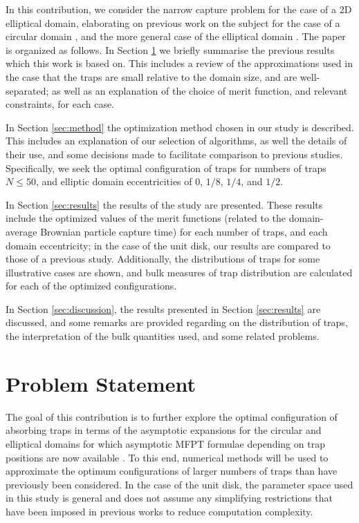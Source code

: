 \documentclass[11pt,letter,subeqn,fleqn]{article}
\begin{document}
In this contribution, we consider the narrow capture problem for the case of a 2D elliptical domain, elaborating on previous work on the subject for the case of a circular domain \cite{kolokolnikov2005optimizing}, and the more general case of the elliptical domain \cite{iyaniwura2020optimization}.
The paper is organized as follows. In Section \ref{sec:problem} we briefly summarise the previous results which this work is based on. This includes a review of the approximations used in the case that the traps are small relative to the domain size, and are well-separated; as well as an explanation of the choice of merit function, and relevant constraints, for each case.

In Section \ref{sec:method} the optimization method chosen in our study is described. This includes an explanation of our selection of algorithms, as well the details of their use, and some decisions made to facilitate comparison to previous studies. Specifically, we seek the optimal configuration of traps for numbers of traps $N \leq 50$, and elliptic domain eccentricities of $0$, $1/8$, $1/4$, and $1/2$.

In Section \ref{sec:results} the results of the study are presented. These results include the optimized values of the merit functions (related to the domain-average Brownian particle capture time) for each number of traps, and each domain eccentricity; in the case of the unit disk, our results are compared to those of a previous study. Additionally, the distributions of traps for some illustrative cases are shown, and bulk measures of trap distribution are calculated for each of the optimized configurations.

In Section \ref{sec:discussion}, the results presented in Section \ref{sec:results} are discussed, and some remarks are provided regarding on the distribution of traps, the interpretation of the bulk quantities used, and some related problems.



\section{Problem Statement} \label{sec:problem}


The goal of this contribution is to further explore the optimal configuration of absorbing traps in terms of the asymptotic expansions for the circular and elliptical domains for which asymptotic MFPT formulae depending on trap positions are now available \cite{kolokolnikov2005optimizing, iyaniwura2020optimization}. To this end, numerical methods will be used to approximate the optimum configurations of larger numbers of traps than have previously been considered. In the case of the unit disk, the parameter space used in this study is general and does not assume any simplifying restrictions that have been imposed in previous works to reduce computation complexity.
\end{document}
